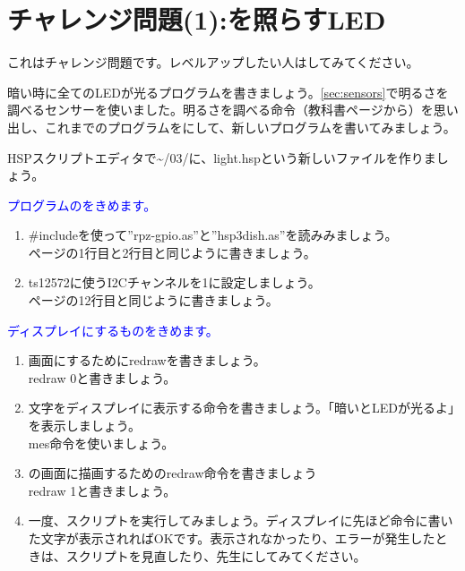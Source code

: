 \documentclass[text03.tex]{subfiles}
\begin{document}
\newpage
\section{チャレンジ問題(1):を照らすLED}
\label{Yamiyo}
これはチャレンジ問題です。レベルアップしたい人はしてみてください。

暗い時に全てのLEDが光るプログラムを書きましょう。\ref{sec:sensors}で明るさを調べるセンサーを使いました。明るさを調べる命令（教科書\pageref{sec:sensors}ページから）を思い出し、これまでのプログラムをにして、新しいプログラムを書いてみましょう。\\
\begin{enumerate}
\renewcommand{\theenumii}{\arabic{enumii}}
\renewcommand{\labelenumii}{\theenumi.\theenumii}
\item HSPスクリプトエディタで\textasciitilde /03/に、light.hspという新しいファイルを作りましょう。
\textcolor{blue}{\item プログラムのをきめます。}
\begin{enumerate}
\item \#includeを使って”rpz-gpio.as”と”hsp3dish.as”を読みみましょう。\\
\pageref{sensors.hsp}ページの1行目と2行目と同じように書きましょう。
\item ts12572に使うI2Cチャンネルを1に設定しましょう。\\
\pageref{sensors.hsp}ページの12行目と同じように書きましょう。
\end{enumerate}
\textcolor{blue}{\item ディスプレイにするものをきめます。}
\begin{enumerate}
\item {}画面にするためにredrawを書きましょう。\\
redraw 0と書きましょう。
\item 文字をディスプレイに表示する命令を書きましょう。「暗いとLEDが光るよ」を表示しましょう。\\
mes命令を使いましょう。
\item {}の画面に描画するためのredraw命令を書きましょう\\
redraw 1と書きましょう。
\item 一度、スクリプトを実行してみましょう。ディスプレイに先ほど命令に書いた文字が表示されればOKです。表示されなかったり、エラーが発生したときは、スクリプトを見直したり、先生にしてみてください。

\end{enumerate}
\end{enumerate}
\end{document}

